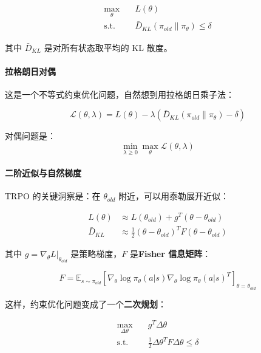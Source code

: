 \begin{equation}
    \begin{aligned}
        \max_\theta \quad & L(\theta) \\
        \text{s.t.} \quad & \bar{D}_{KL}(\pi_{old} \| \pi_\theta) \leq \delta
    \end{aligned}
\end{equation}

其中 $\bar{D}_{KL}$ 是对所有状态取平均的 KL 散度。

\paragraph{拉格朗日对偶}

这是一个不等式约束优化问题，自然想到用拉格朗日乘子法：

\begin{equation}
    \mathcal{L}(\theta, \lambda) = L(\theta) - \lambda \left( \bar{D}_{KL}(\pi_{old} \| \pi_\theta) - \delta \right)
\end{equation}

对偶问题是：
\begin{equation}
    \min_{\lambda \geq 0} \max_\theta \mathcal{L}(\theta, \lambda)
\end{equation}

\paragraph{二阶近似与自然梯度}

TRPO 的关键洞察是：在 $\theta_{old}$ 附近，可以用泰勒展开近似：

\begin{align}
    L(\theta) &\approx L(\theta_{old}) + g^T (\theta - \theta_{old}) \\
    \bar{D}_{KL} &\approx \frac{1}{2} (\theta - \theta_{old})^T F (\theta - \theta_{old})
\end{align}

其中 $g = \nabla_\theta L|_{\theta_{old}}$ 是策略梯度，$F$ 是\textbf{Fisher 信息矩阵}：

\begin{equation}
    F = \mathbb{E}_{s \sim \pi_{old}} \left[ \nabla_\theta \log \pi_\theta(a|s) \nabla_\theta \log \pi_\theta(a|s)^T \right]_{\theta = \theta_{old}}
\end{equation}

这样，约束优化问题变成了一个\textbf{二次规划}：

\begin{equation}
    \begin{aligned}
        \max_{\Delta\theta} \quad & g^T \Delta\theta \\
        \text{s.t.} \quad & \frac{1}{2} \Delta\theta^T F \Delta\theta \leq \delta
    \end{aligned}
\end{equation}

